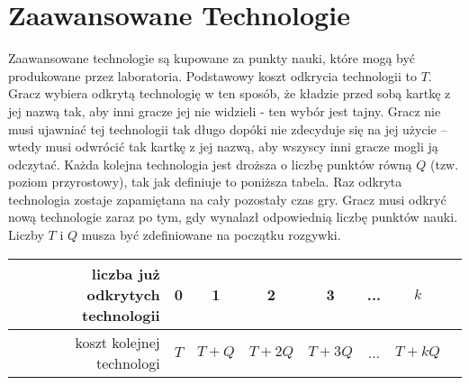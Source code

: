 \documentclass[11pt,a4paper]{article}
\begin{document}
\section{Zaawansowane Technologie}

Zaawansowane technologie są kupowane za punkty nauki, które mogą być produkowane przez laboratoria. Podstawowy koszt odkrycia technologii to $T$. Gracz wybiera odkrytą technologię w ten sposób, że kładzie przed sobą kartkę z jej nazwą tak, aby inni gracze jej nie widzieli - ten wybór jest tajny. Gracz nie musi ujawniać tej technologii tak długo dopóki nie zdecyduje się na jej użycie -- wtedy musi odwrócić tak kartkę z jej nazwą, aby wszyscy inni gracze mogli ją odczytać. Każda kolejna technologia jest droższa o liczbę punktów równą $Q$ (tzw. poziom przyrostowy), tak jak definiuje to poniższa tabela. Raz odkryta technologia zostaje zapamiętana na cały pozostały czas gry. Gracz musi odkryć nową technologie zaraz po tym, gdy wynalazł odpowiednią liczbę punktów nauki. Liczby $T$ i $Q$ musza być zdefiniowane na początku rozgywki.
\begin{center}
  \begin{tabular}{| r | c | c | c | c | c | c | c |}
    \hline
    liczba już odkrytych technologii & 0 & 1 & 2 & 3  & ... & $k$ \\
    \hline
    koszt kolejnej technologi & $T$ & $T+Q$ & $T+2Q$ & $T+3Q$ & ... & $T+kQ$ \\
    \hline
  \end{tabular}
\end{center}
\end{document}

